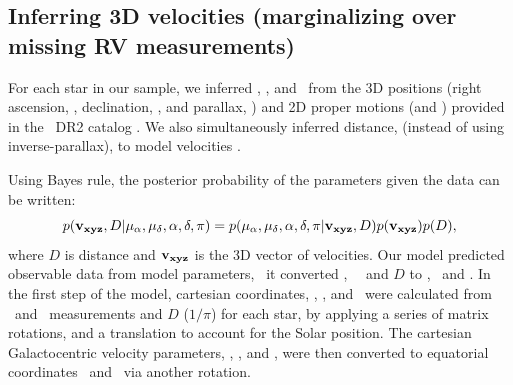 \subsection{Inferring 3D velocities (marginalizing over missing RV
measurements)}
\label{sec:inference}

For each star in our sample, we inferred \vx, \vy, and \vz\ from the 3D
positions (right ascension, \ra, declination, \dec, and parallax, \parallax)
and 2D proper motions (\mura and \mudec) provided in the \gaia\ DR2 catalog
\citep{brown2011}.
We also simultaneously inferred distance, (instead of using inverse-parallax),
to model velocities \citep[see \eg][]{bailer-jones2015, bailer-jones2018}.

Using Bayes rule, the posterior probability of the parameters given the data
can be written:
\begin{equation}
    p({\bf v_{xyz}}, D | \mu_{\alpha}, \mu_{\delta}, \alpha, \delta, \pi) =
    p(\mu_{\alpha}, \mu_{\delta}, \alpha, \delta, \pi | {\bf v_{xyz}}, D)
    p({\bf v_{xyz}}) p(D),
\end{equation}
where $D$ is distance and ${\bf v_{xyz}}$ is the 3D vector of velocities.
Our model predicted observable data from model parameters,
\ie\ it converted \vx, \vy\, \vz\ and $D$ to \pmra, \pmdec\ and \parallax.
In the first step of the model, cartesian coordinates, \x, \y, and \z\, were
calculated from \ra\ and \dec\ measurements and $D$ ($1/\pi$) for each star,
by applying a series of matrix rotations, and a translation to account for the
Solar position.
The cartesian Galactocentric velocity parameters, \vx, \vy, and \vz, were then
converted to equatorial coordinates \pmra\ and \pmdec\ via another rotation.

